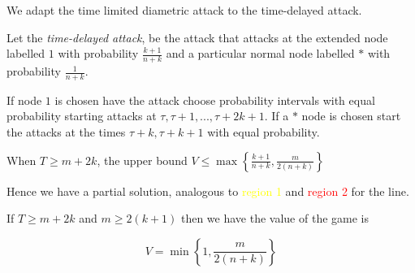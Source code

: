 \documentclass[11pt]{beamer}
\begin{document}
\begin{frame}{\insertsection}
We adapt the time limited diametric attack to the time-delayed attack.

\begin{definition}
Let the \textit{time-delayed attack}, be the attack that attacks at the extended node labelled $1$ with probability $\frac{k+1}{n+k}$ and a particular normal node labelled $*$ with probability $\frac{1}{n+k}$.

If node $1$ is chosen have the attack choose probability intervals with equal probability starting attacks at $\tau, \tau+1,...,\tau+2k+1$. If a $*$ node is chosen start the attacks at the times $\tau+k,\tau+k+1$ with equal probability.
\end{definition}

\begin{figure}
\begin{center}
\end{center}
\end{figure}



\end{frame}

\begin{frame}{\insertsection}

\begin{lemma}
When $T \geq m+2k$, the upper bound $V \leq \max \left\{ \frac{k+1}{n+k} , \frac{m}{2(n+k)}   \right\}$
\end{lemma}

Hence we have a partial solution, analogous to \textcolor{yellow}{region 1} and \textcolor{red}{region 2} for the line.

\begin{theorem}
If $T \geq m+2k$ and $ m \geq 2(k+1)$ then we have the value of the game is

\begin{equation}
V=\min \left\{1,\frac{m}{2(n+k)} \right\} 
\end{equation}
\end{theorem}

\end{frame}
\end{document}
